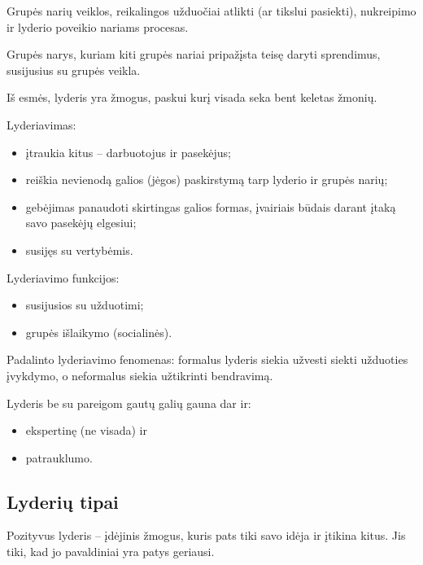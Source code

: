 \begin{defn}[Lyderiavimas]
  Grupės narių veiklos, reikalingos užduočiai atlikti (ar tikslui pasiekti),
  nukreipimo ir lyderio poveikio nariams procesas.
\end{defn}

\begin{defn}[Lyderis]
  Grupės narys, kuriam kiti grupės nariai pripažįsta teisę daryti
  sprendimus, susijusius su grupės veikla.
\end{defn}

Iš esmės, lyderis yra žmogus, paskui kurį visada seka bent keletas žmonių.

Lyderiavimas:
\begin{itemize}
  \item įtraukia kitus – darbuotojus ir pasekėjus;
  \item reiškia nevienodą galios (jėgos) paskirstymą tarp lyderio ir
    grupės narių;
  \item gebėjimas panaudoti skirtingas galios formas, įvairiais būdais
    darant įtaką savo pasekėjų elgesiui;
  \item susijęs su vertybėmis.
\end{itemize}

Lyderiavimo funkcijos:
\begin{itemize}
  \item susijusios su užduotimi;
  \item grupės išlaikymo (socialinės).
\end{itemize}

Padalinto lyderiavimo fenomenas: formalus lyderis siekia užvesti siekti
užduoties įvykdymo, o neformalus siekia užtikrinti bendravimą.

Lyderis be su pareigom gautų galių gauna dar ir:
\begin{itemize}
  \item ekspertinę (ne visada) ir
  \item patrauklumo.
\end{itemize}

\subsection{Lyderių tipai}

Pozityvus lyderis – įdėjinis žmogus, kuris pats tiki savo idėja ir įtikina
kitus. Jis tiki, kad jo pavaldiniai yra patys geriausi.

